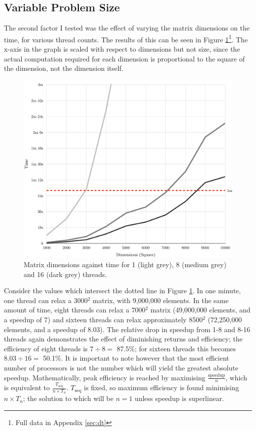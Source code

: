 \documentclass[12pt]{article}
\begin{document}
\subsection{Variable Problem Size}

The second factor I tested was the effect of varying the matrix dimensions on the time, for various thread counts. The results of this can be seen in Figure \ref{fig:dimension}\footnote{Full data in Appendix \ref{sec:dt}}. The x-axis in the graph is scaled with respect to dimensions but not size, since the actual computation required for each dimension is proportional to the square of the dimension, not the dimension itself.

\begin{figure}[h!]
	\centering
	\hspace{-0.5cm}\includegraphics[width=.85\textwidth]{img/dimension-time}
	\caption{Matrix dimensions against time for 1 (light grey), 8 (medium grey) and 16 (dark grey) threads.}
	\label{fig:dimension}
\end{figure}

Consider the values which intersect the dotted line in Figure \ref{fig:dimension}. In one minute, one thread can relax a 3000$^2$ matrix, with 9,000,000 elements. In the same amount of time, eight threads can relax a 7000$^2$ matrix (49,000,000 elements, and a speedup of 7) and sixteen threads can relax approximately 8500$^2$ (72,250,000 elements, and a speedup of 8.03). The relative drop in speedup from 1-8 and 8-16 threads again demonstrates the effect  of diminishing returns and efficiency; the efficiency of eight threads is $7\div{}8=$ 87.5\%; for sixteen threads this becomes $8.03\div{}16=$ 50.1\%. It is important to note however that the most efficient number of processors is not the number which will yield the greatest absolute speedup. Mathematically, peak efficiency is reached by maximising $\frac{\text{speedup}}{n}$, which is equivalent to $\frac{T_\text{seq}}{n\times{T_n}}$. $T_\text{seq}$ is fixed, so maximum efficiency is found minimising $n\times{T_n}$; the solution to which will be $n=1$ unless speedup is superlinear. 
\end{document}
